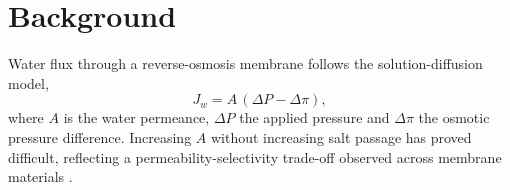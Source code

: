 \chapter{Background}
\label{ch:background}

Water flux through a reverse-osmosis membrane follows the solution-diffusion model,
\begin{equation}
  J_w = A\,(\Delta P - \Delta \pi),
  \label{eq:flux}
\end{equation}
where $A$ is the water permeance, $\Delta P$ the applied pressure and $\Delta \pi$ the osmotic
pressure difference. Increasing $A$ without increasing salt passage has proved difficult,
reflecting a permeability-selectivity trade-off observed across membrane materials
\citep{park2017}.
